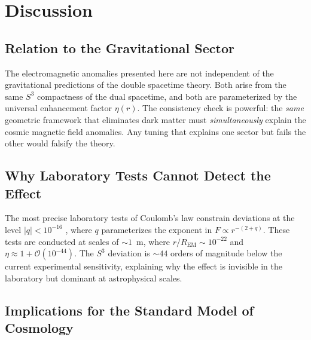 \documentclass[a4paper]{article}
\begin{document}
\section{Discussion}
\label{sec:discussion}

\subsection{Relation to the Gravitational Sector}

The electromagnetic anomalies presented here are not independent of the
gravitational predictions of the double spacetime theory. Both arise from the
same $S^3$ compactness of the dual spacetime, and both are parameterized by the
universal enhancement factor $\eta(r)$. The consistency check is powerful: the
\emph{same} geometric framework that eliminates dark matter must
\emph{simultaneously} explain the cosmic magnetic field anomalies. Any tuning
that explains one sector but fails the other would falsify the theory.

\subsection{Why Laboratory Tests Cannot Detect the Effect}

The most precise laboratory tests of Coulomb's law constrain deviations at the
level $|q| < 10^{-16}$ \cite{williams1971}, where $q$ parameterizes the
exponent in $F \propto r^{-(2+q)}$. These tests are conducted at scales of
$\sim 1$~m, where $r/R_{\text{EM}} \sim 10^{-22}$ and
$\eta \approx 1 + \mathcal{O}(10^{-44})$. The $S^3$ deviation is
$\sim 44$ orders of magnitude below the current experimental sensitivity,
explaining why the effect is invisible in the laboratory but dominant at
astrophysical scales.

\subsection{Implications for the Standard Model of Cosmology}
\end{document}
